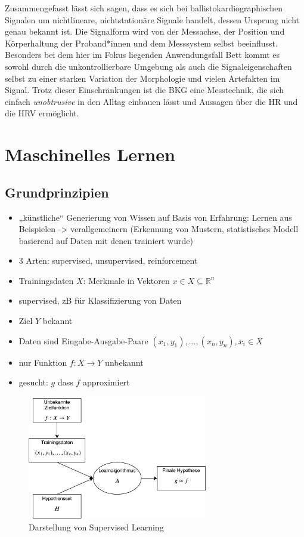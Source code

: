 	
	Zusammengefasst lässt sich sagen, dass es sich bei ballistokardiographischen Signalen um nichtlineare, nichtstationäre Signale handelt, dessen Ursprung nicht genau bekannt ist. Die Signalform wird von der Messachse, der Position und Körperhaltung der Proband*innen und dem Messsystem selbst beeinflusst. Besonders bei dem hier im Fokus liegenden Anwendungsfall Bett kommt es sowohl durch die unkontrollierbare Umgebung als auch die Signaleigenschaften selbst zu einer starken Variation der Morphologie und vielen Artefakten im Signal. Trotz dieser Einschränkungen ist die \acl{BKG} eine Messtechnik, die sich einfach \textit{unobtrusive} in den Alltag einbauen lässt und Aussagen über die \acl{HR} und die \acl{HRV} ermöglicht.

	

\section{Maschinelles Lernen}

	\subsection{Grundprinzipien}
	
	\begin{itemize}
		\item „künstliche“ Generierung von Wissen auf Basis von Erfahrung: Lernen aus Beispielen -> verallgemeinern (Erkennung von Mustern, statistisches Modell basierend auf Daten mit denen trainiert wurde)
		\item 3 Arten: supervised, unsupervised, reinforcement
		\item Trainingsdaten $X$: Merkmale in Vektoren $x \in X \subseteq \mathbb{R}^n$
		\item supervised, zB für Klassifizierung von Daten
		\item Ziel $Y$ bekannt
		\item Daten sind Eingabe-Ausgabe-Paare $(x_1, y_1), ...,(x_n, y_n), x_i \in X$
		\item nur Funktion $f: X \to Y$ unbekannt
		\item gesucht: $g$ dass $f$ approximiert
	\end{itemize}
	
	\begin{figure}[H]
	\centering
		\includegraphics[width=0.7\textwidth]{pic/SupervisedLearning.png}
	\caption[Darstellung von Supervised Learning]{Darstellung von Supervised Learning}
	\label{fig:supervisedLearning}
	\end{figure}

